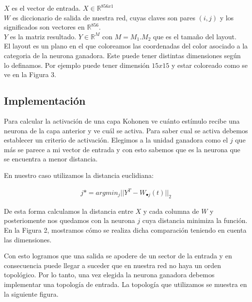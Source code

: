 $X$ es el vector de entrada. $X \in \mathbb{R}^{856x1}$ \\

$W$ es diccionario de salida de nuestra red, cuyas claves son pares $(i,j)$ y los significados son vectores en $\mathbb{R}^{856}$.\\

$Y$ es la matriz resultado. $Y \in \mathbb{R}^{M}$ con $M = M_{1} . M_{2}$ que es el tamaño del layout.\\

El layout es un plano en el que coloreamos las coordenadas del color asociado a la categoria de la neurona ganadora. Este puede tener distintas 
dimensiones según lo definamos. Por ejemplo puede tener dimensión $15 x 15$ y estar coloreado como se ve en la Figura 3.


\subsection{Implementación}

Para calcular la activación de una capa Kohonen ve cuánto estímulo recibe una neurona de la capa anterior y ve cuál se activa.
Para saber cual se activa debemos establecer un criterio de activación. Elegimos a la unidad ganadora como el $j$ que más se 
parece a mi vector de entrada y con esto sabemos que es la neurona que se encuentra a menor distancia. 

En nuestro caso utilizamos la distancia euclidiana:

\begin{align*}
		j* = argmin_{j}||Y^{T} - W_{\bullet j}(t)||_{2}
\end{align*}

De esta forma calculamos la distancia entre $X$ y cada columna de $W$ y posteriomente nos quedamos con la neurona $j$ 
cuya distancia minimiza la función. En la Figura 2, mostramos cómo se realiza dicha comparación teniendo en cuenta las dimensiones.

Con esto logramos que una salida se apodere de un sector de la entrada y en consecuencia puede llegar a suceder que en nuestra red
no haya un orden topológico. Por lo tanto, una vez elegida la neurona ganadora debemos implementar una topología de entrada.
La topología que utilizamos se muestra en la siguiente figura.

